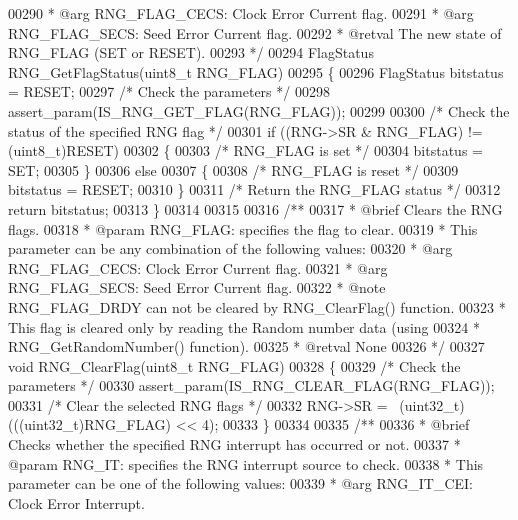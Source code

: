 \begin{DoxyCode}
00290 \textcolor{comment}{  *            @arg RNG\_FLAG\_CECS: Clock Error Current flag.}
00291 \textcolor{comment}{  *            @arg RNG\_FLAG\_SECS: Seed Error Current flag.}
00292 \textcolor{comment}{  * @retval The new state of RNG\_FLAG (SET or RESET).}
00293 \textcolor{comment}{  */}
00294 FlagStatus RNG_GetFlagStatus(uint8\_t RNG\_FLAG)
00295 \{
00296   FlagStatus bitstatus = RESET;
00297   \textcolor{comment}{/* Check the parameters */}
00298   assert_param(IS\_RNG\_GET\_FLAG(RNG\_FLAG));
00299 
00300   \textcolor{comment}{/* Check the status of the specified RNG flag */}
00301   \textcolor{keywordflow}{if} ((RNG->SR & RNG\_FLAG) != (uint8\_t)RESET)
00302   \{
00303     \textcolor{comment}{/* RNG\_FLAG is set */}
00304     bitstatus = SET;
00305   \}
00306   \textcolor{keywordflow}{else}
00307   \{
00308     \textcolor{comment}{/* RNG\_FLAG is reset */}
00309     bitstatus = RESET;
00310   \}
00311   \textcolor{comment}{/* Return the RNG\_FLAG status */}
00312   \textcolor{keywordflow}{return}  bitstatus;
00313 \}
00314 
00315 
00316 \textcolor{comment}{/**}
00317 \textcolor{comment}{  * @brief  Clears the RNG flags.}
00318 \textcolor{comment}{  * @param  RNG\_FLAG: specifies the flag to clear. }
00319 \textcolor{comment}{  *          This parameter can be any combination of the following values:}
00320 \textcolor{comment}{  *            @arg RNG\_FLAG\_CECS: Clock Error Current flag.}
00321 \textcolor{comment}{  *            @arg RNG\_FLAG\_SECS: Seed Error Current flag.}
00322 \textcolor{comment}{  * @note   RNG\_FLAG\_DRDY can not be cleared by RNG\_ClearFlag() function. }
00323 \textcolor{comment}{  *         This flag is cleared only by reading the Random number data (using }
00324 \textcolor{comment}{  *         RNG\_GetRandomNumber() function).                           }
00325 \textcolor{comment}{  * @retval None}
00326 \textcolor{comment}{  */}
00327 \textcolor{keywordtype}{void} RNG_ClearFlag(uint8\_t RNG\_FLAG)
00328 \{
00329   \textcolor{comment}{/* Check the parameters */}
00330   assert_param(IS\_RNG\_CLEAR\_FLAG(RNG\_FLAG));
00331   \textcolor{comment}{/* Clear the selected RNG flags */}
00332   RNG->SR = ~(uint32\_t)(((uint32\_t)RNG\_FLAG) << 4);
00333 \}
00334 
00335 \textcolor{comment}{/**}
00336 \textcolor{comment}{  * @brief  Checks whether the specified RNG interrupt has occurred or not.}
00337 \textcolor{comment}{  * @param  RNG\_IT: specifies the RNG interrupt source to check.}
00338 \textcolor{comment}{  *          This parameter can be one of the following values:}
00339 \textcolor{comment}{  *            @arg RNG\_IT\_CEI: Clock Error Interrupt.}

\end{DoxyCode}

